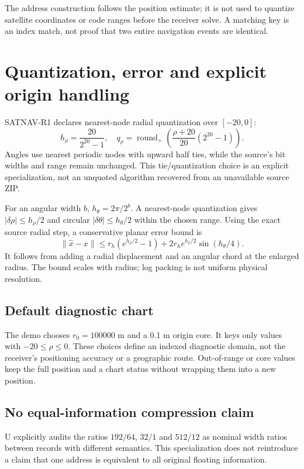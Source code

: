 The address construction follows the position estimate; it is not used to quantize
satellite coordinates or code ranges before the receiver solve. A matching key is an
index match, not proof that two entire navigation events are identical.
\clearpage

\section{Quantization, error and explicit origin handling}
SATNAV-R1 declares nearest-node radial quantization over $[-20,0]$:
\begin{equation}
h_\rho=\frac{20}{2^{20}-1},\quad
q_\rho=\operatorname{round}_{+}\!\left(\frac{\rho+20}{20}(2^{20}-1)\right).
\end{equation}
Angles use nearest periodic nodes with upward half ties, while the source's bit widths
and range remain unchanged. This tie/quantization choice is an explicit specialization,
not an unquoted algorithm recovered from an unavailable source ZIP. 

For an angular width $b$, $h_\theta=2\pi/2^b$. A nearest-node quantization gives
$|\delta\rho|\le h_\rho/2$ and circular $|\delta\theta|\le h_\theta/2$ within the
chosen range. Using the exact source radial step, a conservative planar error bound is
\begin{equation}
\|\widehat x-x\|\le r_h(e^{h_\rho/2}-1)
+2r_he^{h_\rho/2}\sin(h_\theta/4).
\end{equation}
It follows from adding a radial displacement and an angular chord at the enlarged
radius. The bound scales with radius; log packing is not uniform physical resolution.

\subsection{Default diagnostic chart}
The demo chooses $r_0=100000$ m and a 0.1 m origin core. It keys only values with
$-20\le\rho\le0$. These choices define an indexed diagnostic domain, not the
receiver's positioning accuracy or a geographic route. Out-of-range or core values
keep the full position and a chart status without wrapping them into a new position.

\subsection{No equal-information compression claim}
U explicitly audits the ratios $192/64$, $32/1$ and $512/12$ as nominal width ratios
between records with different semantics. This specialization does not reintroduce
a claim that one address is equivalent to all original floating information.

